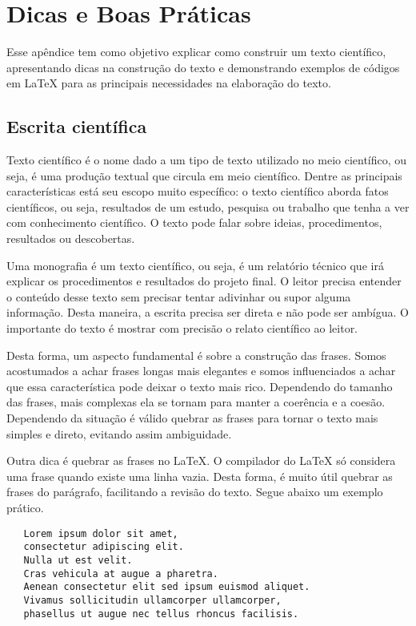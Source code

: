 \chapter{Dicas e Boas Práticas} \label{chp:ap_dicas}

Esse apêndice tem como objetivo explicar como construir um texto científico, apresentando dicas na construção do texto e demonstrando exemplos de códigos em LaTeX para as principais necessidades na elaboração do texto.

\section{Escrita científica}

Texto científico é o nome dado a um tipo de texto utilizado no meio científico, ou seja, 
é uma produção textual que circula em meio científico. 
Dentre as principais características está seu escopo muito específico: o texto científico aborda fatos científicos, 
ou seja, 
resultados de um estudo, pesquisa ou trabalho que tenha a ver com conhecimento científico. 
O texto pode falar sobre ideias, procedimentos, resultados ou descobertas.

Uma monografia é um texto científico, ou seja, é um relatório técnico que irá explicar os procedimentos e resultados do projeto final.
O leitor precisa entender o conteúdo desse texto sem precisar tentar adivinhar ou supor alguma informação.
Desta maneira, a escrita precisa ser direta e não pode ser ambígua. 
O importante do texto é mostrar com precisão o relato científico ao leitor.

Desta forma, um aspecto fundamental é sobre a construção das frases.
Somos acostumados a achar frases longas mais elegantes e somos influenciados a achar que essa característica pode deixar o texto mais rico.
Dependendo do tamanho das frases, mais complexas ela se tornam para manter a coerência e a coesão.
Dependendo da situação é válido quebrar as frases para tornar o texto mais simples e direto, evitando assim ambiguidade.

Outra dica é quebrar as frases no LaTeX.
O compilador do LaTeX só considera uma frase quando existe uma linha vazia. 
Desta forma,
é muito útil quebrar as frases do parágrafo, 
facilitando a revisão do texto.
Segue abaixo um exemplo prático.

\begin{verbatim}
   Lorem ipsum dolor sit amet, 
   consectetur adipiscing elit. 
   Nulla ut est velit. 
   Cras vehicula at augue a pharetra. 
   Aenean consectetur elit sed ipsum euismod aliquet. 
   Vivamus sollicitudin ullamcorper ullamcorper,
   phasellus ut augue nec tellus rhoncus facilisis. 
\end{verbatim}

